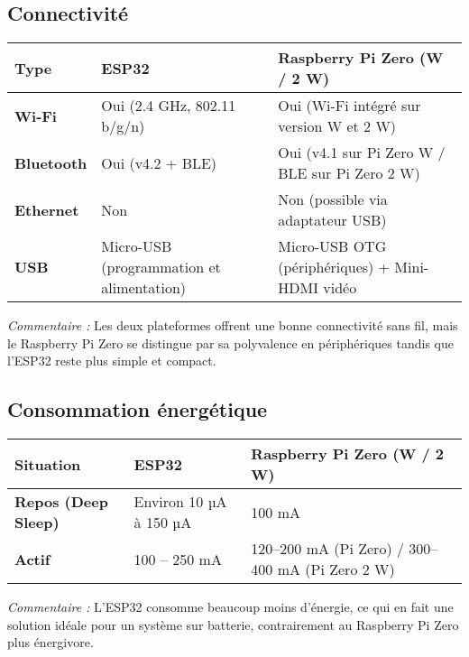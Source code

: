 \documentclass{param}
\begin{document}
\subsection{Connectivité}
\begin{center}
\renewcommand{\arraystretch}{1.3}
\begin{tabularx}{0.95\textwidth}{|>{\bfseries}l|X|X|}
\hline
\textbf{Type} & \textbf{ESP32} & \textbf{Raspberry Pi Zero (W / 2 W)} \\
\hline
Wi-Fi & Oui (2.4 GHz, 802.11 b/g/n) & Oui (Wi-Fi intégré sur version W et 2 W) \\
\hline
Bluetooth & Oui (v4.2 + BLE) & Oui (v4.1 sur Pi Zero W / BLE sur Pi Zero 2 W) \\
\hline
Ethernet & Non & Non (possible via adaptateur USB) \\
\hline
USB & Micro-USB (programmation et alimentation) & Micro-USB OTG (périphériques) + Mini-HDMI vidéo \\
\hline
\end{tabularx}
\end{center}

\noindent\textit{Commentaire :}  
Les deux plateformes offrent une bonne connectivité sans fil, mais le Raspberry Pi Zero se distingue par sa polyvalence en périphériques tandis que l’ESP32 reste plus simple et compact.


\subsection{Consommation énergétique}
\begin{center}
\renewcommand{\arraystretch}{1.3}
\begin{tabularx}{0.95\textwidth}{|>{\bfseries}l|X|X|}
\hline
\textbf{Situation} & \textbf{ESP32} & \textbf{Raspberry Pi Zero (W / 2 W)} \\
\hline
Repos (Deep Sleep) & Environ 10 µA à 150 µA & 100 mA \\
\hline
Actif & 100 – 250 mA & 120–200 mA (Pi Zero) / 300–400 mA (Pi Zero 2 W) \\
\hline
\end{tabularx}
\end{center}

\noindent\textit{Commentaire :}  
L’ESP32 consomme beaucoup moins d’énergie, ce qui en fait une solution idéale pour un système sur batterie, contrairement au Raspberry Pi Zero plus énergivore.
\end{document}
